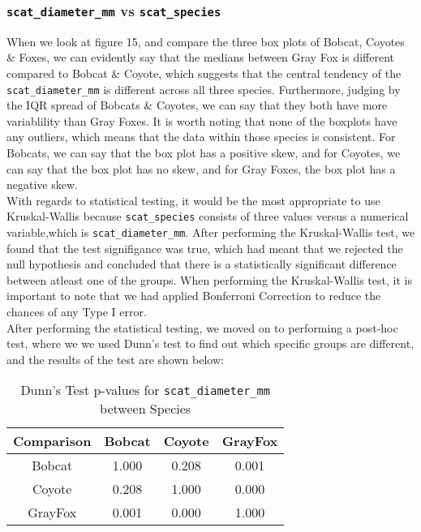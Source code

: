 \documentclass[a4paper]{article}
\begin{document}
\subsubsection{\texttt{scat\_diameter\_mm} vs \texttt{scat\_species}}
When we look at figure 15, and compare the three box plots of Bobcat, Coyotes \& Foxes, we can evidently say that the medians between Gray Fox is different
compared to Bobcat \& Coyote, which suggests that the central tendency of the \texttt{scat\_diameter\_mm} is different across all three species. Furthermore, 
judging by the IQR spread of Bobcats \& Coyotes, we can say that they both have more variablility than Gray Foxes. It is worth noting that none of the 
boxplots have any outliers, which means that the data within those species is consistent. For Bobcats, we can say that the box plot has a positive skew, and 
for Coyotes, we can say that the box plot has no skew, and for Gray Foxes, the box plot has a negative skew. \\

\noindent With regards to statistical testing, it would be the most appropriate to use Kruskal-Wallis because \texttt{scat\_species} consists of three values
versus a numerical variable,which is \texttt{scat\_diameter\_mm}. After performing the Kruskal-Wallis test, we found that the test signifigance was true,
which had meant that we rejected the null hypothesis and concluded that there is a statistically significant difference between atleast one of the groups.
When performing the Kruskal-Wallis test, it is important to note that we had applied Bonferroni Correction to reduce the chances of any Type I error. \\

\noindent After performing the statistical testing, we moved on to performing a post-hoc test, where we we used Dunn's test to find out which specific 
groups are different, and the results of the test are shown below: \\
\begin{table}[h]
    \centering
    \begin{tabular}{|c|c|c|c|}
    \hline
    \textbf{Comparison} & \textbf{Bobcat} & \textbf{Coyote} & \textbf{GrayFox} \\
    \hline
    Bobcat & 1.000 & 0.208 & 0.001 \\
    Coyote & 0.208 & 1.000 & 0.000 \\
    GrayFox & 0.001 & 0.000 & 1.000 \\
    \hline
    \end{tabular}
    \caption{Dunn's Test p-values for \texttt{scat\_diameter\_mm} between Species}
    \label{tab:dunn_test_results}
\end{table}
\end{document}
